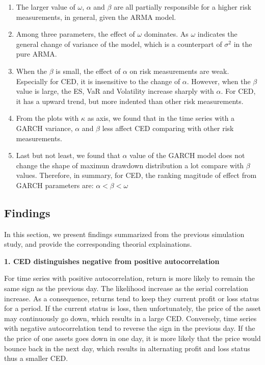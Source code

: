 \documentclass[11pt]{article}
\begin{document}
\begin{enumerate}
\item The larger value of $\omega$, $\alpha$ and $\beta$ are all partially responsible for a higher risk measurements, in general, given the ARMA model.
\item Among three parameters, the effect of $\omega$ dominates. As $\omega$ indicates the general change of variance of the model, which is a counterpart of $\sigma^2$ in the pure ARMA.
\item When the $\beta$ is small, the effect of $\alpha$ on risk measurements are weak. Especially for CED, it is insensitive to the change of $\alpha$. However, when the $\beta$ value is large, the ES, VaR and Volatility increase sharply with $\alpha$. For CED, it has a upward trend, but more indented than other risk measurements.
\item From the plots with $\kappa$ as axis, we found that in the time series with a GARCH variance, $\alpha$ and $\beta$ less affect CED comparing with other risk measurements.
\item Last but not least, we found that $\alpha$ value of the GARCH model does not change the shape of maximun drawdown distribution a lot compare with $\beta$ values. Therefore, in summary, for CED, the ranking magitude of effect from GARCH parameters are: $\alpha < \beta < \omega$
\end{enumerate}

\subsection{Findings}

In this section, we present findings summarized from the previous simulation study, and provide the corresponding theorial explainations. 

\textbf{1. CED distinguishes negative from positive autocorrelation}

For time series with positive autocorrelation, return is more likely to remain the same sign as the previous day. The likelihood increase as the serial correlation increase. As a consequence, returns tend to keep they current profit or loss status for a period. If the current status is loss, then unfortunately, the price of the asset may continuously go down, which results in a large CED. Conversely, time series with negative autocorrelation tend to reverse the sign in the previous day. If the the price of one assets goes down in one day, it is more likely that the price would bounce back in the next day, which results in alternating profit and loss status thus a smaller CED.
\end{document}
